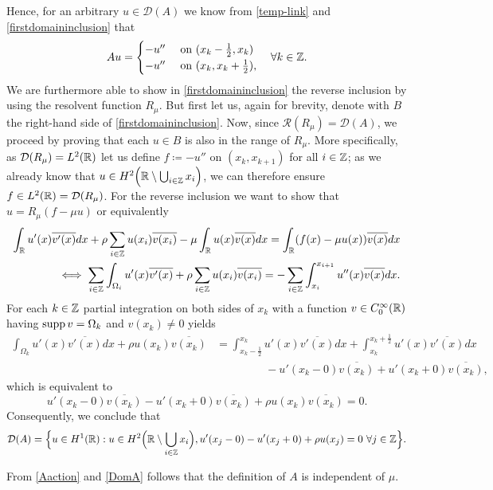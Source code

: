 Hence, for an arbitrary $u \in \mathcal{D}(A)$ we know from \eqref{temp-link} and \eqref{firstdomaininclusion} that
	\begin{equation}
		A u = \begin{cases}
					- u'' & \text{ on } (x_{k} - \frac{1}{2}, x_{k}) \\
					- u'' & \text{ on } (x_{k}, x_{k} + \frac{1}{2}),
			 \end{cases} \quad \forall k \in \mathbb{Z}. \label{Aaction}
	\end{equation} 
We are furthermore able to show in \eqref{firstdomaininclusion} the reverse inclusion by using the resolvent function $R_{\mu}$. But first let us, again for brevity, denote with $B$ the right-hand side of \eqref{firstdomaininclusion}. Now, since $\mathcal{R}(R_{\mu}) = \mathcal{D}(A)$, we proceed by proving that each $u \in B$ is also in the range of $R_{\mu}$. More specifically, as $\mathcal{D}(R_{\mu}) = L^{2}(\mathbb{R})$ let us define $f \coloneqq - u''$ on $(x_{k}, x_{k + 1})$ for all $i \in \mathbb{Z}$; as we already know that $u \in H^{2}\Big(\mathbb{R} \setminus \bigcup_{i \in \mathbb{Z}} x_{i} \Big)$, we can therefore ensure $f \in L^{2}(\mathbb{R}) = \mathcal{D}(R_{\mu})$. For the reverse inclusion we want to show that $u = R_{\mu}(f - \mu u)$ or equivalently 
	\begin{align*}
		 \int_{\mathbb{R}} u'(x) \overline{v'(x)} dx + \rho \sum_{i \in \mathbb{Z}} u(x_{i}) \overline{v(x_{i})} - \mu \int_{\mathbb{R}} u(x) \overline{v(x)} dx = \int_{\mathbb{R}}(f(x)-\mu u(x)) \overline{v(x)} dx \\
		\iff \sum_{i \in \mathbb{Z}} \int_{\Omega_{i}} u'(x) \overline{v'(x)} + \rho \sum_{i \in \mathbb{Z}} u(x_{i}) \overline{v(x_{i})} = - \sum_{i \in \mathbb{Z}} \int_{x_{i}}^{x_{i+1}} u''(x) \overline{v(x)} dx.
	\end{align*}
For each $k \in \mathbb{Z}$ partial integration on both sides of $x_{k}$ with a function $v \in C_{0}^{\infty}(\mathbb{R})$ having $\operatorname{supp} v = \Omega_{k}$ and $v(x_{k}) \neq 0$ yields
	\begin{align*}
		\int_{\Omega_{k}} u'(x) \overline{v'(x)} dx + \rho u(x_{k}) \overline{v(x_{k})} & = \int_{x_{k} - \frac{1}{2}}^{x_{k}} u'(x) \overline{v'(x)} dx + \int_{x_{k}}^{x_{k} +\frac{1}{2}} u'(x) \overline{v'(x)} dx \\
		& ~\qquad ~\qquad - u'(x_{k}-0) \overline{v(x_{k})}  + u'(x_{k}+0) \overline{v(x_{k})},
	\end{align*}
which is equivalent to
	\[ u'(x_{k}-0)\overline{v(x_{k})} - u'(x_{k}+0)\overline{v(x_{k})} + \rho u(x_{k})\overline{v(x_{k})} = 0. \]
Consequently, we conclude that
	\begin{equation}
		\mathcal{D}(A) = \Big\{ u \in H^{1}(\mathbb{R}): u \in H^{2}\Big(\mathbb{R} \setminus \bigcup_{i \in \mathbb{Z}} x_{i} \Big), u'(x_{j} - 0) - u'(x_{j} + 0) + \rho u(x_{j}) = 0 ~\forall j \in \mathbb{Z} \Big\}. \label{DomA}
	\end{equation}
\begin{remark}
	From \eqref{Aaction} and \eqref{DomA} follows that the definition of $A$ is independent of $\mu$.
\end{remark}

